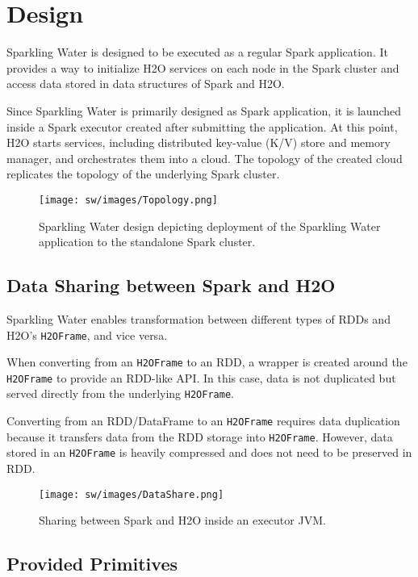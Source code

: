 \documentclass{standalone}
\begin{document}
\section{Design}
Sparkling Water is designed to be executed as a regular Spark application. It provides a way to initialize H2O services on each node in the Spark cluster and access data stored in data structures of Spark and H2O.

Since Sparkling Water is primarily designed as Spark application, it is launched
inside a Spark executor created after submitting the application. At this
point, H2O starts services, including distributed key-value (K/V) store and memory manager, and orchestrates them into a cloud. The topology of the created cloud replicates the topology of the underlying Spark cluster.

\begin{figure}[h!]
	\centering
	\texttt{[image: sw/images/Topology.png]}
	\caption{Sparkling Water design depicting deployment of the Sparkling Water application to the standalone Spark cluster.}
\end{figure}


\subsection{Data Sharing between Spark and H2O}

Sparkling Water enables transformation between different types of RDDs and H2O's \texttt{H2OFrame}, and vice versa.

When converting from an \texttt{H2OFrame} to an RDD, a wrapper is created around the \texttt{H2OFrame} to provide an RDD-like API. In this case,  data is not duplicated but served directly from the underlying \texttt{H2OFrame}.

Converting from an RDD/DataFrame to an \texttt{H2OFrame} requires data duplication because it transfers data from the RDD storage into \texttt{H2OFrame}. However, data stored in an \texttt{H2OFrame} is heavily compressed and does not need to be preserved in RDD.

\begin{figure}[h!]
	\centering
	\texttt{[image: sw/images/DataShare.png]}
	\caption{Sharing between Spark and H2O inside an executor JVM.}
\end{figure}


\subsection{Provided Primitives}
\end{document}
